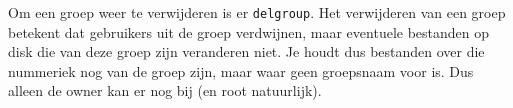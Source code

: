 Om een groep weer te verwijderen is er \texttt{delgroup}. Het verwijderen van een groep betekent dat gebruikers uit de groep verdwijnen, maar eventuele bestanden op disk die van deze groep zijn veranderen niet. Je houdt dus bestanden over die nummeriek nog van de groep zijn, maar waar geen groepsnaam voor is. Dus alleen de owner kan er nog bij (en root natuurlijk).
